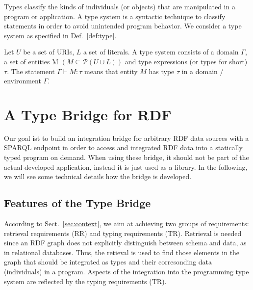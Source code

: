 \documentclass{llncs} %
\begin{document}

Types classify the kinds of individuals (or objects) that are manipulated in a program or application.
A type system is a syntactic technique to classify statements in order to avoid unintended program behavior.
We consider a type system as specified in Def.~\ref{def:type}. 

\begin{definition}
\label{def:type}
Let $U$ be a set of URIs, $L$  a set of literals.
A type system consists of a domain $\Gamma$,
a set of entities M $(M \subseteq \mathcal{P}(U \cup L))$ and type expressions (or types for short) $\tau$.
The statement $\Gamma \vdash M: \tau$ means that entity $M$ has type $\tau$ in a domain / environment $\Gamma$.
\end{definition}




\section{A Type Bridge for RDF}  
\label{sec:design}



Our goal ist to build an integration bridge for arbitrary RDF data sources with a SPARQL endpoint
in order to access and integrated RDF data into a statically typed program on demand.
When using these bridge, it should not be part of the actual developed application,
instead it is just used as a library. In the following, we will see some technical details how
the bridge is developed.

\subsection{Features of the Type Bridge}
  
According to Sect.~\ref{sec:context}, we aim at achieving two groups of requirements:
retrieval requirements (RR) and typing requirements (TR). Retrieval is needed since  an RDF graph does not explicitly 
distinguish between schema and data, as in relational databases. Thus, the retieval is
used to find those elements in the graph that should be integrated as types and their corresonding data (individuals) in a program.
Aspects of the integration into the programming type system are reflected by the typing requirements (TR).
\end{document}
